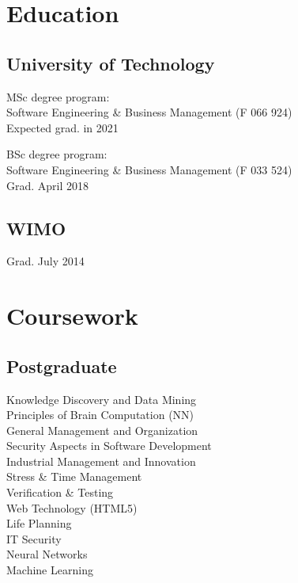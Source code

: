 \documentclass[]{resume}
\begin{document}
\begin{minipage}[t]{0.33\textwidth} 
\section{Education} 

\subsection{University of Technology}
MSc degree program: \\
Software Engineering \& Business Management (F 066 924)\\
Expected grad. in 2021
\sectionsep

BSc degree program: \\
Software Engineering \& Business Management (F 033 524)\\
Grad. April 2018
\sectionsep

\subsection{WIMO}
Grad. July 2014
\sectionsep
\section{Coursework}
\subsection{Postgraduate}
Knowledge Discovery and Data Mining \\
Principles of Brain Computation (NN) \\
General Management and Organization \\
Security Aspects in Software Development \\
Industrial Management and Innovation \\
Stress \& Time Management \\
Verification \& Testing \\
Web Technology (HTML5) \\
Life Planning \\
IT Security \\
Neural Networks \\
Machine Learning
\sectionsep


\end{minipage}
\end{document}
